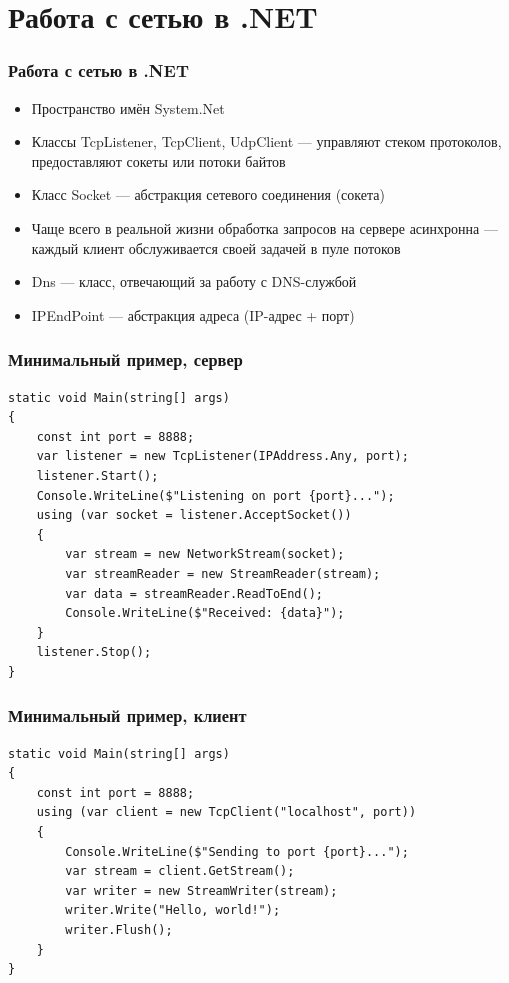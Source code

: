 \documentclass[xetex,mathserif,serif]{beamer}
\begin{document}
	\section{Работа с сетью в .NET}

	\begin{frame}
		\frametitle{Работа с сетью в .NET}
		\begin{itemize}
			\item Пространство имён System.Net
			\item Классы TcpListener, TcpClient, UdpClient --- управляют стеком протоколов, предоставляют сокеты или потоки байтов
			\item Класс Socket --- абстракция сетевого соединения (сокета)
			\item Чаще всего в реальной жизни обработка запросов на сервере асинхронна --- каждый клиент обслуживается своей задачей в пуле потоков
			\item Dns --- класс, отвечающий за работу с DNS-службой
			\item IPEndPoint --- абстракция адреса (IP-адрес + порт)
		\end{itemize}
	\end{frame}

	\begin{frame}[fragile]
		\frametitle{Минимальный пример, сервер}
		\begin{footnotesize}
			\begin{verbatim}
static void Main(string[] args)
{
    const int port = 8888;
    var listener = new TcpListener(IPAddress.Any, port);
    listener.Start();
    Console.WriteLine($"Listening on port {port}...");
    using (var socket = listener.AcceptSocket())
    {
        var stream = new NetworkStream(socket);
        var streamReader = new StreamReader(stream);
        var data = streamReader.ReadToEnd();
        Console.WriteLine($"Received: {data}");
    }
    listener.Stop();
}
			\end{verbatim}
		\end{footnotesize}
	\end{frame}

	\begin{frame}[fragile]
		\frametitle{Минимальный пример, клиент}
		\begin{footnotesize}
			\begin{verbatim}
static void Main(string[] args)
{
    const int port = 8888;
    using (var client = new TcpClient("localhost", port))
    {
        Console.WriteLine($"Sending to port {port}...");
        var stream = client.GetStream();
        var writer = new StreamWriter(stream);
        writer.Write("Hello, world!");
        writer.Flush();
    }
}
			\end{verbatim}
		\end{footnotesize}
	\end{frame}
\end{document}
